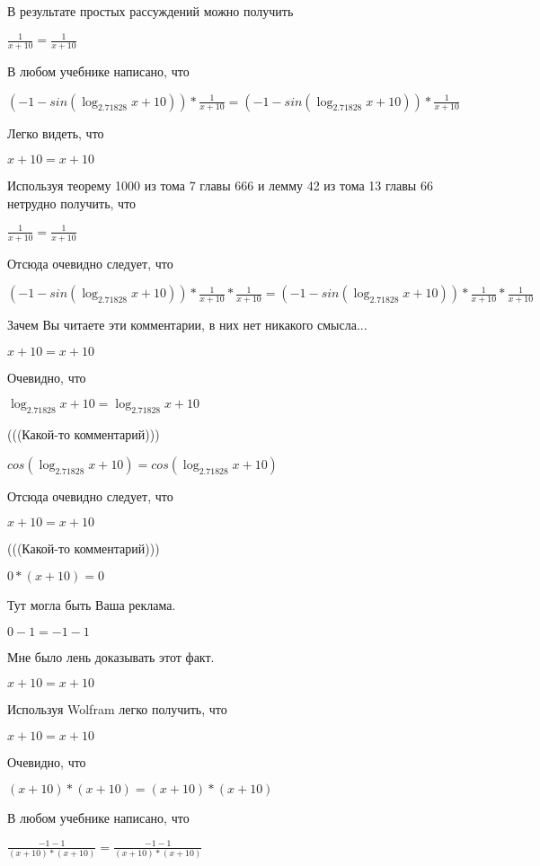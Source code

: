 \documentclass[12pt,a4paper,fleqn]{article}
\theoremstyle{definition}
\begin{document}
В результате простых рассуждений можно получить 

$\frac{ 1 }{ x  +  10 }
 = \frac{ 1 }{ x  +  10 }
$

В любом учебнике написано, что 

$( -1  - sin(\log_{ 2.71828 }{ x  +  10 })) * \frac{ 1 }{ x  +  10 }
 = ( -1  - sin(\log_{ 2.71828 }{ x  +  10 })) * \frac{ 1 }{ x  +  10 }
$

Легко видеть, что 

$ x  +  10  =  x  +  10 $

Используя теорему 1000 из тома 7 главы 666 и лемму 42 из тома 13 главы 66 нетрудно получить, что 

$\frac{ 1 }{ x  +  10 }
 = \frac{ 1 }{ x  +  10 }
$

Отсюда очевидно следует, что 

$( -1  - sin(\log_{ 2.71828 }{ x  +  10 })) * \frac{ 1 }{ x  +  10 }
 * \frac{ 1 }{ x  +  10 }
 = ( -1  - sin(\log_{ 2.71828 }{ x  +  10 })) * \frac{ 1 }{ x  +  10 }
 * \frac{ 1 }{ x  +  10 }
$

Зачем Вы читаете эти комментарии, в них нет никакого смысла... 

$ x  +  10  =  x  +  10 $

Очевидно, что 

$\log_{ 2.71828 }{ x  +  10 } = \log_{ 2.71828 }{ x  +  10 }$

(((Какой-то комментарий))) 

$cos(\log_{ 2.71828 }{ x  +  10 }) = cos(\log_{ 2.71828 }{ x  +  10 })$

Отсюда очевидно следует, что 

$ x  +  10  =  x  +  10 $

(((Какой-то комментарий))) 

$ 0  * ( x  +  10 ) =  0 $

Тут могла быть Ваша реклама. 

$ 0  -  1  =  -1  -  1 $

Мне было лень доказывать этот факт.

$ x  +  10  =  x  +  10 $

Используя Wolfram легко получить, что 

$ x  +  10  =  x  +  10 $

Очевидно, что 

$( x  +  10 ) * ( x  +  10 ) = ( x  +  10 ) * ( x  +  10 )$

В любом учебнике написано, что 

$\frac{ -1  -  1 }{( x  +  10 ) * ( x  +  10 )}
 = \frac{ -1  -  1 }{( x  +  10 ) * ( x  +  10 )}
$
\end{document}
